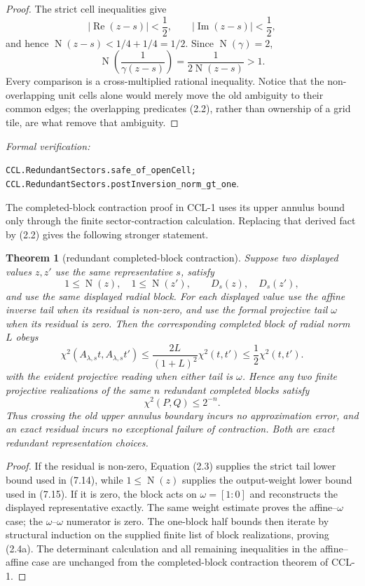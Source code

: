 \documentclass[10pt]{article}
\newtheorem{theorem}{Theorem}[section]
\theoremstyle{definition}
\theoremstyle{remark}
\newcommand{\Norm}{\operatorname{N}}
\newcommand{\Ree}{\operatorname{Re}}
\newcommand{\Imm}{\operatorname{Im}}
\newcommand{\leanref}[1]{\par\smallskip\noindent
  \emph{Formal verification:}\par\nobreak
  {\raggedright\nolinkurl{#1}.\par}}
\begin{document}
\begin{proof}
The strict cell inequalities give
\[
 |\Ree(z-s)|<\frac12,
 \qquad |\Imm(z-s)|<\frac12,
\]
and hence $\Norm(z-s)<1/4+1/4=1/2$.  Since $\Norm(\gamma)=2$,
\[
 \Norm\!\left(\frac1{\gamma(z-s)}\right)
 =\frac1{2\Norm(z-s)}>1.
\]
Every comparison is a cross-multiplied rational inequality.  Notice that the non-overlapping unit cells alone would merely move the old ambiguity to their common edges; the overlapping predicates (2.2), rather than ownership of a grid tile, are what remove that ambiguity.
\end{proof}

\leanref{CCL.RedundantSectors.safe_of_openCell;
CCL.RedundantSectors.postInversion_norm_gt_one}

The completed-block contraction proof in CCL-1 uses its upper annulus bound
only through the finite sector-contraction calculation.  Replacing that
derived fact by (2.2) gives the following stronger statement.

\begin{theorem}[redundant completed-block contraction]\label{thm:redundant-block-contraction}
Suppose two displayed values $z,z'$ use the same representative $s$, satisfy
\[
 1\le\Norm(z),\quad 1\le\Norm(z'),
 \qquad D_s(z),\quad D_s(z'),
\]
and use the same displayed radial block.
For each displayed value use the affine inverse tail when its residual is
non-zero, and use the formal projective tail $\omega$ when its residual is
zero.  Then the corresponding completed block of radial norm $L$ obeys
\[
 \chi^2(A_{\lambda,s}t,A_{\lambda,s}t')
 \le \frac{2L}{(1+L)^2}\chi^2(t,t')
 \le\frac12\chi^2(t,t').
\tag{2.4}
\]
with the evident projective reading when either tail is $\omega$.  Hence any
two finite projective realizations of the same $n$ redundant completed blocks
satisfy
\[
 \chi^2(P,Q)\le 2^{-n}.
\tag{2.4a}
\]
Thus crossing the old upper annulus boundary incurs no approximation error,
and an exact residual incurs no exceptional failure of contraction.  Both are
exact redundant representation choices.
\end{theorem}

\begin{proof}
If the residual is non-zero, Equation (2.3) supplies the strict tail lower
bound used in (7.14), while $1\le\Norm(z)$ supplies the output-weight lower
bound used in (7.15).  If it is zero, the block acts on $\omega=[1:0]$ and
reconstructs the displayed representative exactly.  The same weight estimate
proves the affine--$\omega$ case; the $\omega$--$\omega$ numerator is zero.
The one-block half bounds then iterate by structural induction on the supplied
finite list of block realizations, proving (2.4a).  The determinant calculation
and all remaining inequalities in the affine--affine case are unchanged from
the completed-block contraction theorem of CCL-1.
\end{proof}
\end{document}
